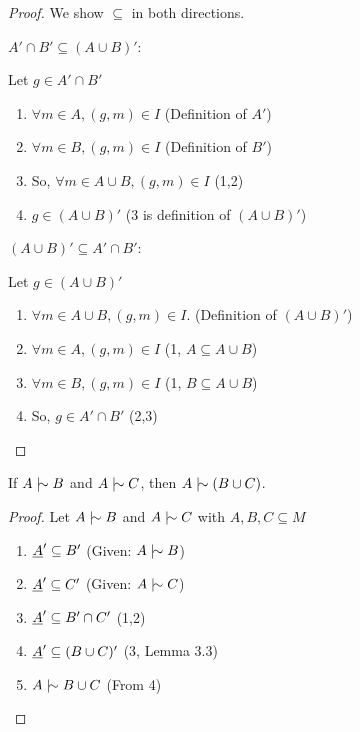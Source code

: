 \documentclass[11pt]{article}
\begin{document}
\begin{proof}
  We show $\subseteq$ in both directions.

  $A' \cap B' \subseteq (A \cup B)'$:

  Let $g \in A' \cap B'$
  \begin{enumerate}
    \item $\forall m \in A, (g,m) \in I$ \hfill (Definition of $A'$)
    \item $\forall m \in B, (g,m) \in I$ \hfill (Definition of $B'$)
    \item So, $\forall m \in A \cup B, (g,m) \in I$ \hfill (1,2)
    \item $g \in (A \cup B)'$ \hfill (3 is definition of $(A \cup B)'$)\\
  \end{enumerate}

  $(A \cup B)' \subseteq A' \cap B'$:

  Let $g \in (A \cup B)'$
  \begin{enumerate}
    \item $\forall m \in A \cup B, (g,m) \in I$. \hfill (Definition of $(A \cup B)'$)
    \item $\forall m \in A, (g,m) \in I$ \hfill (1, $A \subseteq A \cup B$)
    \item $\forall m \in B, (g,m) \in I$ \hfill (1, $B \subseteq A \cup B$)
    \item So, $g \in A' \cap B'$ \hfill(2,3)
  \end{enumerate}
\end{proof}

\begin{theorem}[And]
  If $A \twiddle B$ and $A \twiddle C$, then $A \twiddle (B \cup C)$.
\end{theorem}

\begin{proof}
  Let $A \twiddle B$ and $A \twiddle C$ with $A, B, C \subseteq M$
  \begin{enumerate}
    \item $\underline{A}' \subseteq B'$ \hfill (Given: $A \twiddle B$)
    \item $\underline{A}' \subseteq C'$ \hfill (Given: $A \twiddle C$)
    \item $\underline{A}' \subseteq B' \cap C'$ \hfill (1,2)
    \item $\underline{A}' \subseteq (B\cup C)'$ \hfill (3, Lemma 3.3)
    \item $A \twiddle B \cup C$ \hfill (From 4)
  \end{enumerate}
\end{proof}
\end{document}
